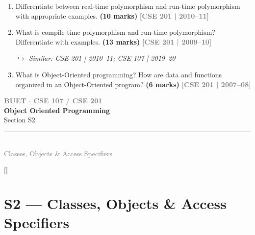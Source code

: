 \documentclass[12pt,a3paper]{article}
\newcommand{\yr}[1]{\hfill\textcolor{gray}{\small\textbf{[#1]}}}
\newcommand{\mk}[1]{\textcolor{orange!70!black}{\small\textbf{(#1 marks)}}}
\newcommand{\variant}[1]{\par\vspace{1pt}\textcolor{blue!50!black}%
  {\footnotesize\textit{$\hookrightarrow$ Similar: #1}}}
\newcommand{\secdivider}[4]{%
  \newpage\thispagestyle{empty}%
  \vspace*{\fill}%
  \begin{tcolorbox}[enhanced,colback=#4!7,colframe=#3,boxrule=1.5pt,arc=8pt,
    left=20pt,right=20pt,top=22pt,bottom=22pt,
    shadow={3pt}{-3pt}{0pt}{black!15}]
    \centering
    {\large\textcolor{gray}{\textbf{BUET $\cdot$ CSE 107 / CSE 201}}}\\[8pt]
    {\fontsize{26}{32}\selectfont\bfseries\textcolor{#3}{Object Oriented Programming}}\\[6pt]
    {\fontsize{15}{19}\selectfont\textcolor{dgray}{#1}}\\[12pt]
    \textcolor{#3!60}{\rule{0.5\textwidth}{0.5pt}}\\[6pt]
    {\small\textcolor{gray}{#2}}
  \end{tcolorbox}%
  \vspace*{\fill}\newpage%
}
\begin{document}
\begin{enumerate}
\item Differentiate between real-time polymorphism and run-time polymorphism with appropriate examples. \mk{10}
\yr{CSE 201 | 2010--11}

\item What is compile-time polymorphism and run-time polymorphism? Differentiate with examples. \mk{13}
\yr{CSE 201 | 2009--10}
\variant{CSE 201 | 2010--11; CSE 107 | 2019--20}




\item What is Object-Oriented programming? How are data and functions organized in an Object-Oriented program? \mk{6}
\yr{CSE 201 | 2007--08}





\end{enumerate}
\newpage

\secdivider{Section S2}{Classes, Objects \& Access Specifiers}{cB}{cB}
\label{sec:S2}
\titleformat{\section}{\large\bfseries\color{cB}}{}{0em}{}[\titlerule]
\section{S2 --- Classes, Objects \& Access Specifiers}
\end{document}
